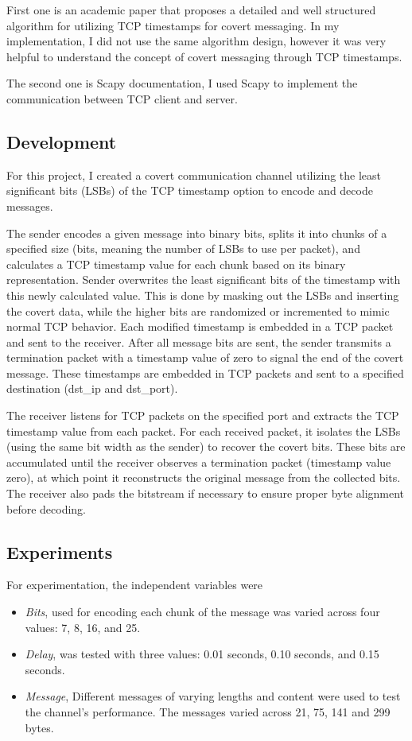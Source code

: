 \documentclass[10pt,a4paper]{article}
\begin{document}
First one is an academic paper that proposes a detailed and well structured algorithm for utilizing TCP timestamps for covert messaging. In my implementation, I did not use the same algorithm design, however it was very helpful to understand the concept of covert messaging through TCP timestamps.

The second one is Scapy documentation, I used Scapy to implement the communication between TCP client and server. 

\subsection*{Development}

For this project, I created a covert communication channel utilizing the least significant bits (LSBs) of the TCP timestamp option to encode and decode messages.


The sender encodes a given message into binary bits, splits it into chunks of a specified size (bits, meaning the number of LSBs to use per packet), and calculates a TCP timestamp value for each chunk based on its binary representation. 
Sender overwrites the least significant bits of the timestamp with this newly calculated value. 
This is done by masking out the LSBs and inserting the covert data, while the higher bits are randomized or incremented to mimic normal TCP behavior. 
Each modified timestamp is embedded in a TCP packet and sent to the receiver.
After all message bits are sent, the sender transmits a termination packet with a timestamp value of zero to signal the end of the covert message.
These timestamps are embedded in TCP packets and sent to a specified destination (dst\_ip and dst\_port). 


The receiver listens for TCP packets on the specified port and extracts the TCP timestamp value from each packet.
 For each received packet, it isolates the LSBs (using the same bit width as the sender) to recover the covert bits. 
 These bits are accumulated until the receiver observes a termination packet (timestamp value zero), at which point it reconstructs the original message from the collected bits.
  The receiver also pads the bitstream if necessary to ensure proper byte alignment before decoding.


\subsection*{Experiments}
For experimentation, the independent variables were 
\begin{itemize}
    \item \textit{Bits}, used for encoding each chunk of the message was varied across four values: 7, 8, 16, and 25.
    \item \textit{Delay}, was tested with three values: 0.01 seconds, 0.10 seconds, and 0.15 seconds.
    \item \textit{Message}, Different messages of varying lengths and content were used to test the channel's performance. The messages varied across 21, 75, 141 and 299 bytes.

\end{itemize}
\end{document}
